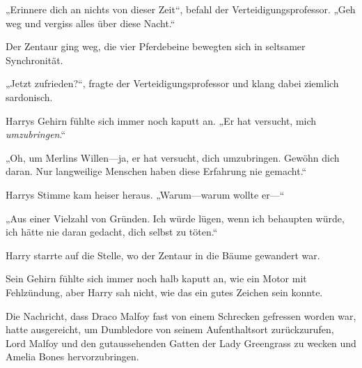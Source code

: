 „Erinnere dich an nichts von dieser Zeit“, befahl der Verteidigungsprofessor.
„Geh weg und vergiss alles über diese Nacht.“

Der Zentaur ging weg, die vier Pferdebeine bewegten sich in seltsamer Synchronität.

„Jetzt zufrieden?“, fragte der Verteidigungsprofessor und klang dabei ziemlich sardonisch.

Harrys Gehirn fühlte sich immer noch kaputt an.
„Er hat versucht, mich \emph{umzubringen}.“

„Oh, um Merlins Willen—ja, er hat versucht, dich umzubringen. Gewöhn dich daran. Nur langweilige Menschen haben diese Erfahrung nie gemacht.“

Harrys Stimme kam heiser heraus. „Warum—warum wollte er—“

„Aus einer Vielzahl von Gründen. Ich würde lügen, wenn ich behaupten würde, ich hätte nie daran gedacht, dich selbst zu töten.“

Harry starrte auf die Stelle, wo der Zentaur in die Bäume gewandert war.

Sein Gehirn fühlte sich immer noch halb kaputt an, wie ein Motor mit Fehlzündung, aber Harry sah nicht, wie das ein gutes Zeichen sein konnte.

\later

Die Nachricht, dass Draco Malfoy fast von einem Schrecken gefressen worden war, hatte ausgereicht, um Dumbledore von seinem Aufenthaltsort zurückzurufen, Lord Malfoy und den gutaussehenden Gatten der Lady Greengrass zu wecken und Amelia Bones hervorzubringen.

